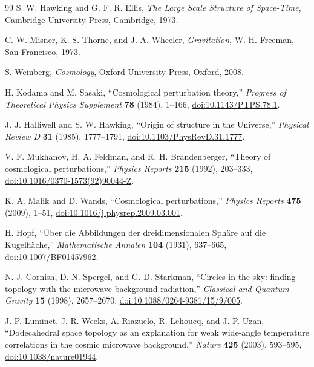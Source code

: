 \documentclass[11pt,a4paper]{article}
\numberwithin{equation}{section}
\theoremstyle{definition}
\theoremstyle{plain}
\theoremstyle{remark}
\begin{document}
\begin{thebibliography}{99}
S. W. Hawking and G. F. R. Ellis, \emph{The Large Scale Structure of Space-Time}, Cambridge University Press, Cambridge, 1973.

C. W. Misner, K. S. Thorne, and J. A. Wheeler, \emph{Gravitation}, W. H. Freeman, San Francisco, 1973.

S. Weinberg, \emph{Cosmology}, Oxford University Press, Oxford, 2008.

H. Kodama and M. Sasaki, ``Cosmological perturbation theory,'' \emph{Progress of Theoretical Physics Supplement} \textbf{78} (1984), 1--166, \href{https://doi.org/10.1143/PTPS.78.1}{doi:10.1143/PTPS.78.1}.

J. J. Halliwell and S. W. Hawking, ``Origin of structure in the Universe,'' \emph{Physical Review D} \textbf{31} (1985), 1777--1791, \href{https://doi.org/10.1103/PhysRevD.31.1777}{doi:10.1103/PhysRevD.31.1777}.

V. F. Mukhanov, H. A. Feldman, and R. H. Brandenberger, ``Theory of cosmological perturbations,'' \emph{Physics Reports} \textbf{215} (1992), 203--333, \href{https://doi.org/10.1016/0370-1573(92)90044-Z}{doi:10.1016/0370-1573(92)90044-Z}.

K. A. Malik and D. Wands, ``Cosmological perturbations,'' \emph{Physics Reports} \textbf{475} (2009), 1--51, \href{https://doi.org/10.1016/j.physrep.2009.03.001}{doi:10.1016/j.physrep.2009.03.001}.

H. Hopf, ``\"Uber die Abbildungen der dreidimensionalen Sph\"are auf die Kugelfl\"ache,'' \emph{Mathematische Annalen} \textbf{104} (1931), 637--665, \href{https://doi.org/10.1007/BF01457962}{doi:10.1007/BF01457962}.

N. J. Cornish, D. N. Spergel, and G. D. Starkman, ``Circles in the sky: finding topology with the microwave background radiation,'' \emph{Classical and Quantum Gravity} \textbf{15} (1998), 2657--2670, \href{https://doi.org/10.1088/0264-9381/15/9/005}{doi:10.1088/0264-9381/15/9/005}.

J.-P. Luminet, J. R. Weeks, A. Riazuelo, R. Lehoucq, and J.-P. Uzan, ``Dodecahedral space topology as an explanation for weak wide-angle temperature correlations in the cosmic microwave background,'' \emph{Nature} \textbf{425} (2003), 593--595, \href{https://doi.org/10.1038/nature01944}{doi:10.1038/nature01944}.



\end{thebibliography}
\end{document}
